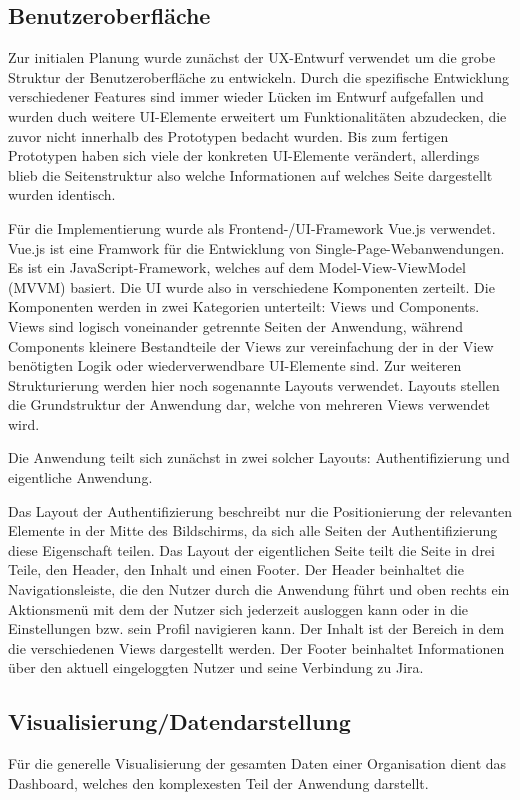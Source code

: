 \subsection{Benutzeroberfläche}
Zur initialen Planung wurde zunächst der UX-Entwurf verwendet um die grobe Struktur der Benutzeroberfläche zu entwickeln. Durch die spezifische Entwicklung verschiedener Features sind immer wieder Lücken im Entwurf aufgefallen und wurden duch weitere UI-Elemente erweitert um Funktionalitäten abzudecken, die zuvor nicht innerhalb des Prototypen bedacht wurden. Bis zum fertigen Prototypen haben sich viele der konkreten UI-Elemente verändert, allerdings blieb die Seitenstruktur also welche Informationen auf welches Seite dargestellt wurden identisch.

Für die Implementierung wurde als Frontend-/UI-Framework Vue.js verwendet. Vue.js ist eine Framwork für die Entwicklung von Single-Page-Webanwendungen. Es ist ein JavaScript-Framework, welches auf dem Model-View-ViewModel (MVVM) basiert. Die UI wurde also in verschiedene Komponenten zerteilt. Die Komponenten werden in zwei Kategorien unterteilt: Views und Components. Views sind logisch voneinander getrennte Seiten der Anwendung, während Components kleinere Bestandteile der Views zur vereinfachung der in der View benötigten Logik oder wiederverwendbare UI-Elemente sind. Zur weiteren Strukturierung werden hier noch sogenannte Layouts verwendet. Layouts stellen die Grundstruktur der Anwendung dar, welche von mehreren Views verwendet wird.

Die Anwendung teilt sich zunächst in zwei solcher Layouts: Authentifizierung und eigentliche Anwendung.

Das Layout der Authentifizierung beschreibt nur die Positionierung der relevanten Elemente in der Mitte des Bildschirms, da sich alle Seiten der Authentifizierung diese Eigenschaft teilen.
Das Layout der eigentlichen Seite teilt die Seite in drei Teile, den Header, den Inhalt und einen Footer. Der Header beinhaltet die Navigationsleiste, die den Nutzer durch die Anwendung führt und oben rechts ein Aktionsmenü mit dem der Nutzer sich jederzeit ausloggen kann oder in die Einstellungen bzw. sein Profil navigieren kann. Der Inhalt ist der Bereich in dem die verschiedenen Views dargestellt werden. Der Footer beinhaltet Informationen über den aktuell eingeloggten Nutzer und seine Verbindung zu Jira.

\subsection{Visualisierung/Datendarstellung}
Für die generelle Visualisierung der gesamten Daten einer Organisation dient das Dashboard, welches den komplexesten Teil der Anwendung darstellt.

